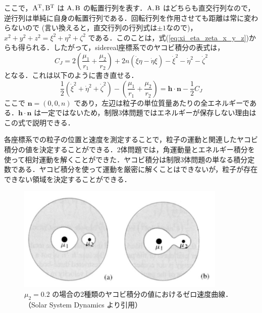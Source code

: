 \documentclass[11pt,a4paper,oneside,onecolumn]{jreport}
\begin{document}
ここで，${\rm A}^{\rm T}, {\rm B}^{\rm T}$ は ${\rm A}, {\rm B}$ の転置行列を表す．${\rm A}, {\rm B}$ はどちらも直交行列なので，逆行列は単純に自身の転置行列である．回転行列を作用させても距離は常に変わらないので (言い換えると，直交行列の行列式は$\pm 1$なので)，$x^2 + y^2 + z^2 = \xi^2 + \eta^2 + \zeta^2$ である．このことは，式(\ref{eq:xi_eta_zeta_x_y_z})からも得られる．したがって，sidereal座標系でのヤコビ積分の表式は，
\begin{equation}
C_J = 2 \left( \frac{\mu_1}{r_1} + \frac{\mu_2}{r_2} \right) + 2 n (\dot{\xi} \eta - \dot{\eta} \xi) - \dot{\xi}^2 - \dot{\eta}^2 - \dot{\zeta}^2 \label{eq:C_J}
\end{equation}
となる．これは以下のように書き直せる．
\begin{equation}
 \frac{1}{2} (\dot{\xi}^2 + \dot{\eta}^2 + \dot{\zeta}^2) - \left( \frac{\mu_1}{r_1} + \frac{\mu_2}{r_2} \right) = {\bm h} \cdot {\bm n} - \frac{1}{2} C_J
\end{equation}
ここで ${\bm n} = (0, 0, n)$ であり，左辺は粒子の単位質量あたりの全エネルギーである．${\bm h} \cdot {\bm n}$ は一定ではないため，制限3体問題ではエネルギーが保存しない理由はこの式で説明できる．

各座標系での粒子の位置と速度を測定することで，粒子の運動と関連したヤコビ積分の値を決定することができる．2体問題では，角運動量とエネルギー積分を使って相対運動を解くことができた．ヤコビ積分は制限3体問題の単なる積分定数である．ヤコビ積分を使って運動を厳密に解くことはできないが，粒子が存在できない領域を決定することができる．

\begin{figure}[H]
\centering
\includegraphics[width=10cm]{./image/sec3_2.pdf}
\caption{$\mu_2 = 0.2$ の場合の2種類のヤコビ積分の値におけるゼロ速度曲線．（Solar System Dynamics\cite{SSD} より引用）\label{fig:zerovelo}}
\end{figure}
\end{document}
